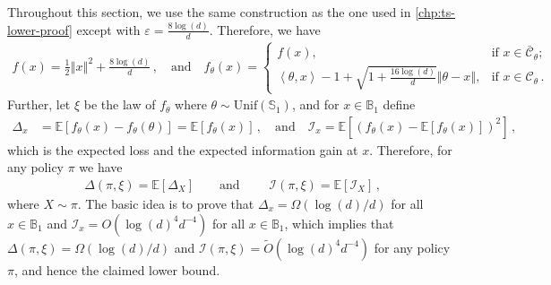 \documentclass[letter, 12pt]{report}
\newcommand{\ip}[1]{\left \langle #1 \right \rangle}
\newcommand{\sphere}{\mathbb{S}}
\newcommand{\ball}{\mathbb{B}}
\newcommand{\paren}[1]{\left( #1 \right)}
\newcommand{\brak}[1]{\left[ #1 \right]}
\newcommand{\norm}[1]{\left \Vert  #1 \right \Vert}
\newcommand{\E}{\mathbb E}
\newcommand{\cC}{\mathcal C}
\newcommand{\I}{\mathcal{I}}
\newcommand{\1}{\mathbf{1}}
\renewcommand{\epsilon}{\varepsilon}
\theoremstyle{plain}
\theoremstyle{definition}
\theoremstyle{remark}
\begin{document}
Throughout this section, we use the same construction as the one used in \cref{chp:ts-lower-proof}
except with $\epsilon = \frac{8\log(d)}{d}$.
Therefore, we have
\begin{align*}
    f(x)         = \frac12 \norm{x}^2 + \frac{8\log(d)}{d}\,, \quad \text{and} \quad
    f_\theta(x)  =
    \begin{cases}
        f(x),                                                                 & \text{if } x \in \bar{\cC}_{\theta}; \\
        \ip{\theta, x} - 1 + \sqrt{1 + \frac{16\log(d)}{d}}\norm{\theta - x}, & \text{if } x \in \cC_{\theta}\,.
    \end{cases}
\end{align*}
Further, let $\xi$ be the law of $f_\theta$ where $\theta \sim \text{Unif}(\sphere_1)$,
and for $x \in \mathbb{B}_1$ define
\begin{align*}
    \Delta_x & = \E\brak{
        f_\theta(x) - f_{\theta}(\theta)
    }
    = \E\brak{
        f_\theta(x)
    }\,, \quad \text{and} \quad
    \I_x = \E\brak{
        \paren{f_\theta(x) - \E\brak{f_\theta(x)}}^2
    } \,,
\end{align*}
which is the expected loss and the expected information gain at $x$.
Therefore, for any policy $\pi$ we have
\begin{align*}
    \Delta(\pi, \xi) = \E[\Delta_X] \qquad \text{and } \qquad
    \I(\pi, \xi) = \E[\I_X] \,,
\end{align*}
where $X \sim \pi$.
The basic idea is to prove that $\Delta_x = \Omega(\log(d)/d)$ for all
$x \in \ball_1$ and $\I_x = O(\log(d)^4 d^{-4})$ for all $x \in \ball_1$,
which implies that $\Delta(\pi, \xi) = \Omega(\log(d)/d)$ and $\I(\pi, \xi) = \tilde O(\log(d)^4 d^{-4})$
for any policy $\pi$, and hence the claimed lower bound.
\end{document}
